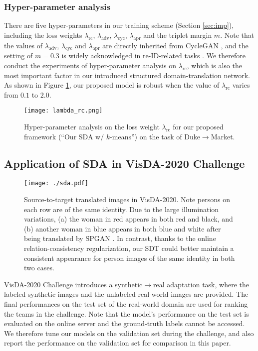 \documentclass[journal]{IEEEtran}
\begin{document}
\subsubsection{\textbf{ {Hyper-parameter analysis}}}
 {
There are five hyper-parameters in our training scheme (Section \ref{sec:imp}), including the loss weights $\lambda_\text{rc}$, $\lambda_\text{adv}$, $\lambda_\text{cyc}$, $\lambda_\text{apr}$ and the triplet margin $m$. Note that the values of $\lambda_\text{adv}$, $\lambda_\text{cyc}$ and $\lambda_\text{apr}$ are directly inherited from CycleGAN \cite{zhu2017unpaired}, and the setting of $m=0.3$ is widely acknowledged in re-ID-related tasks \cite{luo2019bag,ge2020mutual}. We therefore conduct the experiments of hyper-parameter analysis on $\lambda_\text{rc}$, which is also the most important factor in our introduced structured domain-translation network. As shown in Figure \ref{fig:rc}, our proposed model is robust when the value of $\lambda_\text{rc}$ varies from $0.1$ to $2.0$.}

\begin{figure}
    \centering
    \texttt{[image: lambda\_rc.png]}
    \caption{Hyper-parameter analysis on the loss weight $\lambda_\text{rc}$ for our proposed framework (``Our SDA w/ $k$-means'') on the task of Duke$\to$Market.}
    \label{fig:rc}
\end{figure}

\subsection{Application of SDA in VisDA-2020 Challenge}


\begin{figure}[t]
\centering
\texttt{[image: ./sda.pdf]}
\caption{Source-to-target translated images in VisDA-2020.   {Note persons on each row are of the same identity.}
Due to the large illumination variations,
(a) the woman in red appears in both red and black, and (b) another woman in blue appears in both blue and white after being translated by SPGAN \cite{deng2018image}.
In contrast, thanks to the online relation-consistency regularization, our SDT could better maintain a consistent appearance for person images of the same identity in both two cases.
}
\label{fig:sda}
\end{figure}

VisDA-2020 Challenge introduces a synthetic$\to$real adaptation task, where the labeled synthetic images and the unlabeled real-world images are provided.
 {The final performances on the test set of the real-world domain are used for ranking the teams in the challenge. Note that the model's performance on the test set is evaluated on the online server and the ground-truth labels cannot be accessed.  We therefore tune our models on the validation set during the challenge, and also report the performance on the validation set for comparison in this paper.}
\end{document}
